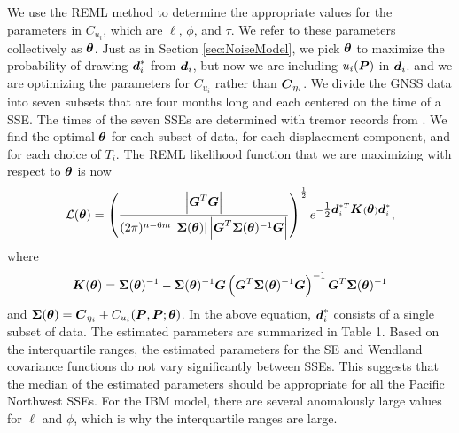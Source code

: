 \documentclass[extra,mreferee]{gji}
\begin{document}

We use the REML method to determine the appropriate values for the
parameters in $C_{u_i}$, which are $\ell$, $\phi$, and $\tau$. We
refer to these parameters collectively as $\mitbf{\theta}$. Just as in
Section \ref{sec:NoiseModel}, we pick $\mitbf{\theta}$ to maximize the
probability of drawing $\data_i^*$ from $\data_i$, but now we are
including $u_i(\points)$ in $\data_i$. and we are optimizing the
parameters for $C_{u_i}$ rather than $\mitbf{C}_{\eta_i}$. We divide
the GNSS data into seven subsets that are four months long and each
centered on the time of a SSE. The times of the seven SSEs are
determined with tremor records from \cite{Wech2010}. We find the
optimal $\mitbf{\theta}$ for each subset of data, for each
displacement component, and for each choice of $T_i$. The REML
likelihood function that we are maximizing with respect to
$\mitbf{\theta}$ is now
\begin{equation}\label{eq:REMLPrior} 
\mathcal{L}(\mitbf{\theta}) =
\left(\frac{\left| \G^T \G \right|}{(2\pi)^{n-6m}
                                    \left| \mitbf{\Sigma}(\mitbf{\theta}) \right| 
                                    \left| \G^T \mitbf{\Sigma}(\mitbf{\theta})^{-1} \G \right|}\right)^{\frac{1}{2}} 
                              e^{-\tfrac{1}{2} \data_i^{*T} \mitbf{K}(\mitbf{\theta}) \data_i^*},
\end{equation}
where
\begin{equation}
\mitbf{K}(\mitbf{\theta}) = \mitbf{\Sigma}(\mitbf{\theta})^{-1} - 
                            \mitbf{\Sigma}(\mitbf{\theta})^{-1} \G
                            \left( \G^T \mitbf{\Sigma}(\mitbf{\theta})^{-1} \G \right)^{-1}
                            \G^T \mitbf{\Sigma}(\mitbf{\theta})^{-1}
\end{equation}
and $\mitbf{\Sigma}(\mitbf{\theta}) = \mitbf{C}_{\eta_i} +
C_{u_i}(\points,\points;\mitbf{\theta})$. In the above equation,
$\data^*_i$ consists of a single subset of data. The estimated
parameters are summarized in Table 1. Based on the interquartile
ranges, the estimated parameters for the SE and Wendland covariance
functions do not vary significantly between SSEs. This suggests that
the median of the estimated parameters should be appropriate for all
the Pacific Northwest SSEs. For the IBM model, there are several
anomalously large values for $\ell$ and $\phi$, which is why the
interquartile ranges are large.
\end{document}
